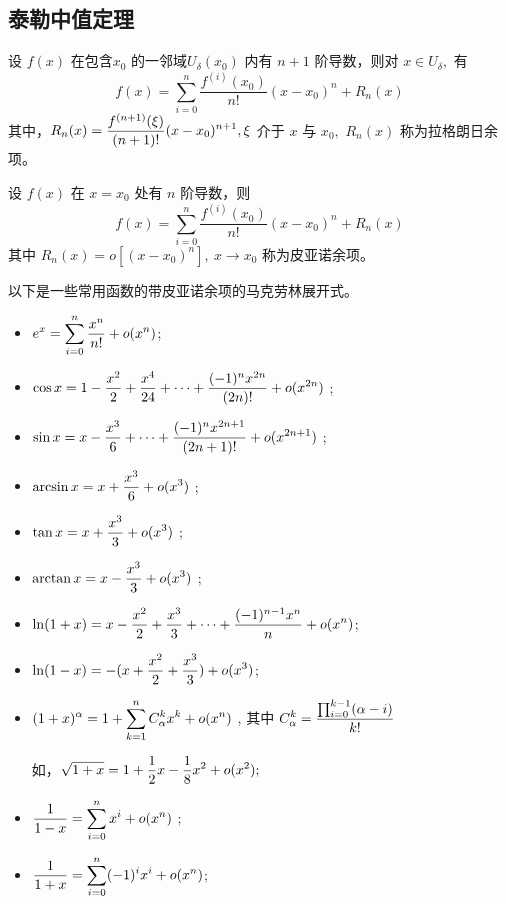 \subsection{泰勒中值定理}

\begin{Theo}[带拉格朗日余项的泰勒中值定理]

    设 $ f(x) $ 在包含$ x_0 $ 的一邻域$ U_\delta(x_0) $ 内有 $ n+1 $ 阶导数，则对 $ x\in U_\delta, $ 
    有$$
        f(x) = \sum_{i=0}^n \frac{f^{(i)}(x_0)}{n!}(x-x_0)^n + R_n(x)
    $$ 
    其中，$\displaystyle R_n(x)=\frac{f^{(n+1)}(\xi)}{(n+1)!}(x-x_0)^{n+1}, \xi $ 介于 $ x $ 与 $ x_0, $ 
    $ R_n(x) $ 称为拉格朗日余项。
\end{Theo}

\begin{Theo}[带皮亚诺余项的泰勒定理]

    设 $ f(x) $ 在 $ x=x_0 $ 处有 $ n $ 阶导数，则$$
        f(x) = \sum_{i=0}^n \frac{f^{(i)}(x_0)}{n!}(x-x_0)^n + R_n(x)
    $$ 其中 $ R_n(x)=o[(x-x_0)^n],\ x\rightarrow x_0 $ 称为皮亚诺余项。
\end{Theo}

以下是一些常用函数的带皮亚诺余项的马克劳林展开式。

\begin{itemize}
    \item $\displaystyle e^x = \sum_{i=0}^n \dfrac{x^n}{n!}+ o(x^n)$;
    \item $\displaystyle \cos x = 1 - \frac{x^2}{2} + \dfrac{x^4}{24} +\dots + \frac{(-1)^{n}x^{2n}}{(2n)!} + o(x^{2n})$ ;
    \item $\displaystyle \sin x = x - \frac{x^3}{6} + \dots + \frac{(-1)^{n}x^{2n+1}}{(2n+1)!} + o(x^{2n+1}) $ ;
    \item $\displaystyle \arcsin x = x + \frac{x^3}{6} +o(x^3)$ ;
    \item $\displaystyle \tan x = x + \frac{x^3}{3} + o(x^3)$ ;
    \item $\displaystyle \arctan x = x - \frac{x^3}{3} + o(x^3)$ ;
    \item $\displaystyle \ln (1+x) = x - \frac{x^2}{2} + \frac{x^3}{3} + \dots + \frac{(-1)^{n-1}x^n}{n} + o(x^n) $;
    \item $\displaystyle \ln(1-x) = -(x+\frac{x^2}{2} + \frac{x^3}{3}) + o(x^3)$;
    \item $\displaystyle (1+x)^\alpha = 1+\sum_{k=1}^n C_\alpha^kx^k + o(x^n) $ ,
    其中 $\displaystyle C_\alpha^k=\frac{\prod_{i = 0}^{k-1}(\alpha - i)}{k!} $ 

    如，$ \displaystyle \sqrt{1+x} = 1 + \dfrac{1}{2}x - \dfrac{1}{8}x^2 + o(x^2); $ 
    \item $\displaystyle \frac{1}{1-x} = \sum_{i=0}^n x^i + o(x^n) $ ;
    \item $\displaystyle \frac{1}{1+x} = \sum_{i=0}^n (-1)^i x^i + o(x^n) $;
\end{itemize}

